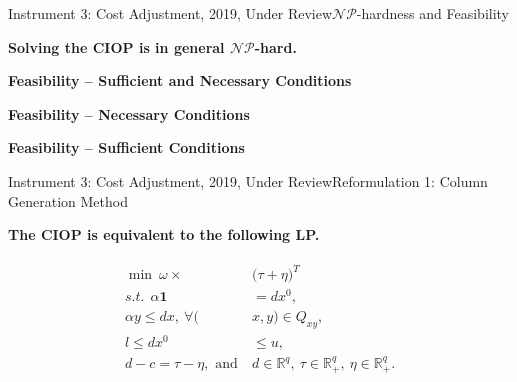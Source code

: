 \documentclass[14pt]{beamer}
\newcommand{\R}{\mathbb{R}}
\begin{document}
\begin{frame}{Instrument 3: Cost Adjustment, {\footnotesize 2019, Under Review}}{$\mathcal{NP}$-hardness and Feasibility}
\begin{theorem}
\justifying
\small
\centering
\textbf{\rm Solving the CIOP is in general $\mathcal{NP}$-hard.}
\end{theorem}
\begin{theorem}\label{theorem:SAndN}
\justifying
\small
\centering
\textbf{\rm Feasibility -- Sufficient and Necessary Conditions}
\end{theorem}
\begin{theorem}\label{theorem:necessary}
\justifying
\small
\centering
\textbf{\rm Feasibility -- Necessary Conditions}
\end{theorem}
\begin{theorem}\label{theorem:sufficient}
\justifying
\small
\centering
\textbf{\rm Feasibility -- Sufficient Conditions}
\end{theorem}
\end{frame}



\begin{frame}{Instrument 3: Cost Adjustment, {\footnotesize 2019, Under Review}}{Reformulation 1: Column Generation Method}
\begin{lemma}\label{lemma:equivalence1}
\centering
\small
\textbf{\rm The CIOP is equivalent to the following LP.}
\end{lemma}
\small
\begin{eqnarray*}\label{eqn:cplp}
\begin{aligned}
\min ~\omega \times &\big(\tau + \eta\big)^T\\
s.t.~~\alpha \textbf{1} &= dx^0,\\
\alpha y \leq dx,~\forall (&x,y) \in Q_{xy},\\
l \leq dx^0 &\leq u,\\
d-c = \tau - \eta, \mbox{ and} ~&d \in \R^{q}, ~\tau \in \R^{q}_+, ~\eta \in \R^{q}_+.
\end{aligned}
\end{eqnarray*}
\end{frame}
\end{document}

